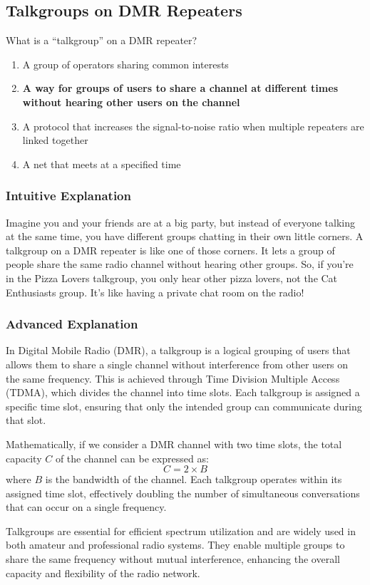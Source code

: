 \subsection{Talkgroups on DMR Repeaters}
\label{T8D02}

\begin{tcolorbox}[colback=gray!10!white,colframe=black!75!black,title=T8D02]
What is a “talkgroup” on a DMR repeater?
\begin{enumerate}[label=\Alph*]
    \item A group of operators sharing common interests
    \item \textbf{A way for groups of users to share a channel at different times without hearing other users on the channel}
    \item A protocol that increases the signal-to-noise ratio when multiple repeaters are linked together
    \item A net that meets at a specified time
\end{enumerate}
\end{tcolorbox}

\subsubsection{Intuitive Explanation}
Imagine you and your friends are at a big party, but instead of everyone talking at the same time, you have different groups chatting in their own little corners. A talkgroup on a DMR repeater is like one of those corners. It lets a group of people share the same radio channel without hearing other groups. So, if you're in the Pizza Lovers talkgroup, you only hear other pizza lovers, not the Cat Enthusiasts group. It's like having a private chat room on the radio!

\subsubsection{Advanced Explanation}
In Digital Mobile Radio (DMR), a talkgroup is a logical grouping of users that allows them to share a single channel without interference from other users on the same frequency. This is achieved through Time Division Multiple Access (TDMA), which divides the channel into time slots. Each talkgroup is assigned a specific time slot, ensuring that only the intended group can communicate during that slot.

Mathematically, if we consider a DMR channel with two time slots, the total capacity \( C \) of the channel can be expressed as:
\[ C = 2 \times B \]
where \( B \) is the bandwidth of the channel. Each talkgroup operates within its assigned time slot, effectively doubling the number of simultaneous conversations that can occur on a single frequency.

Talkgroups are essential for efficient spectrum utilization and are widely used in both amateur and professional radio systems. They enable multiple groups to share the same frequency without mutual interference, enhancing the overall capacity and flexibility of the radio network.

